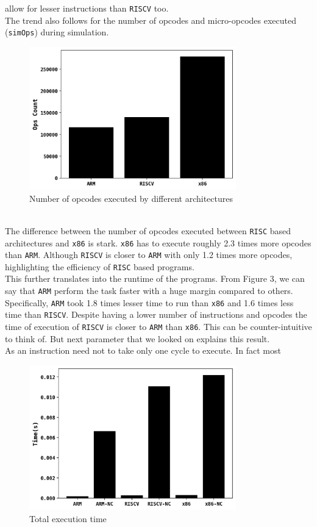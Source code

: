 allow for lesser instructions than \texttt{RISCV} too.\\
The trend also follows for the number of opcodes and micro-opcodes executed (\texttt{simOps}) during simulation.
\begin{figure}[h]
    \centering
    \includegraphics[width=0.8\textwidth]{./figs/2.png}
    \caption{Number of opcodes executed by different architectures}
    \label{fig:Number of opcodes executed by different architectures}
\end{figure}\\
The difference between the number of opcodes executed between \texttt{RISC} based architectures and \texttt{x86}
is stark. \texttt{x86} has to execute roughly 2.3 times more opcodes than \texttt{ARM}. Although \texttt{RISCV} is closer
to \texttt{ARM} with only 1.2 times more opcodes, highlighting the efficiency of \texttt{RISC} based programs.\\
This further translates into the runtime of the programs. From Figure 3, we can say that \texttt{ARM} perform
the task faster with a huge margin compared to others. Specifically, \texttt{ARM} took 1.8 times lesser time
to run than \texttt{x86} and 1.6 times less time than \texttt{RISCV}. Despite having a lower number of instructions
and opcodes the time of execution of \texttt{RISCV} is closer to \texttt{ARM} than \texttt{x86}. This can
be counter-intuitive to think of. But next parameter that we looked on explains this result.\\
As an instruction need not to take only one cycle to execute. In fact most
\begin{figure}[H]
    \centering
    \includegraphics[width=0.8\textwidth]{./figs/3.png}
    \caption{Total execution time}
    \label{fig:Total execution time}
\end{figure}
